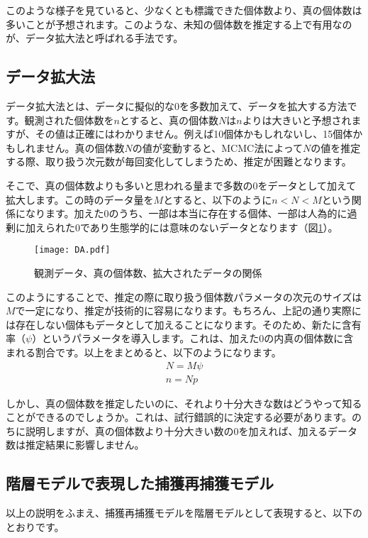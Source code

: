 このような様子を見ていると、少なくとも標識できた個体数より、真の個体数は多いことが予想されます。このような、未知の個体数を推定する上で有用なのが、データ拡大法と呼ばれる手法です。

	\subsection{データ拡大法}
データ拡大法とは、データに擬似的な0を多数加えて、データを拡大する方法です。観測された個体数を$n$とすると、真の個体数$N$は$n$よりは大きいと予想されますが、その値は正確にはわかりません。例えば10個体かもしれないし、15個体かもしれません。真の個体数$N$の値が変動すると、MCMC法によって$N$の値を推定する際、取り扱う次元数が毎回変化してしまうため、推定が困難となります。

そこで、真の個体数よりも多いと思われる量まで多数の0をデータとして加えて拡大します。この時のデータ量を$M$とすると、以下のように$n < N < M$という関係になります。加えた0のうち、一部は本当に存在する個体、一部は人為的に過剰に加えられた0であり生態学的には意味のないデータとなります（図\ref{DA}）。
\begin{figure}[htb]
\begin{center}
\graphicspath{{4_hm/figs/}}
\texttt{[image: DA.pdf]}\\
\caption{観測データ、真の個体数、拡大されたデータの関係}
\label{DA}
\end{center}
\end{figure}

このようにすることで、推定の際に取り扱う個体数パラメータの次元のサイズは$M$で一定になり、推定が技術的に容易になります。もちろん、上記の通り実際には存在しない個体もデータとして加えることになります。そのため、新たに含有率（$\psi$）というパラメータを導入します。これは、加えた0の内真の個体数に含まれる割合です。以上をまとめると、以下のようになります。
\begin{align}
N = M\psi \\
n = Np
\end{align}

しかし、真の個体数を推定したいのに、それより十分大きな数はどうやって知ることができるのでしょうか。これは、試行錯誤的に決定する必要があります。のちに説明しますが、真の個体数より十分大きい数の0を加えれば、加えるデータ数は推定結果に影響しません。

	\subsection{階層モデルで表現した捕獲再捕獲モデル}
以上の説明をふまえ、捕獲再捕獲モデルを階層モデルとして表現すると、以下のとおりです。
